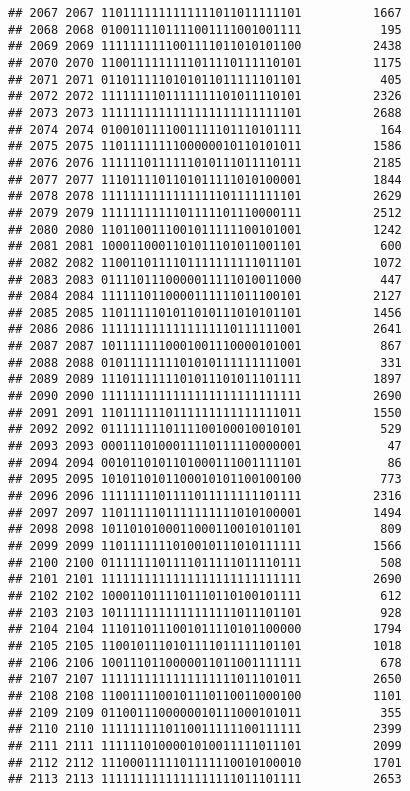 \documentclass[]{article}
\begin{document}
\begin{verbatim}
## 2067 2067 1101111111111111011011111101          1667
## 2068 2068 0100111101111001111001001111           195
## 2069 2069 1111111111001111011010101100          2438
## 2070 2070 1100111111111011110111110101          1175
## 2071 2071 0110111110101011011111101101           405
## 2072 2072 1111111101111111101011110101          2326
## 2073 2073 1111111111111111111111111101          2688
## 2074 2074 0100101111001111101110101111           164
## 2075 2075 1101111111100000010110101011          1586
## 2076 2076 1111110111111010111011110111          2185
## 2077 2077 1110111101101011111010100001          1844
## 2078 2078 1111111111111111101111111101          2629
## 2079 2079 1111111111101111101110000111          2512
## 2080 2080 1101100111001011111100101001          1242
## 2081 2081 1000110001101011101011001101           600
## 2082 2082 1100110111101111111111011101          1072
## 2083 2083 0111101110000011111010011000           447
## 2084 2084 1111110110000111111011100101          2127
## 2085 2085 1101111101011010111010101101          1456
## 2086 2086 1111111111111111110111111001          2641
## 2087 2087 1011111110001001110000101001           867
## 2088 2088 0101111111101010111111111001           331
## 2089 2089 1110111111101011101011101111          1897
## 2090 2090 1111111111111111111111111111          2690
## 2091 2091 1101111110111111111111111011          1550
## 2092 2092 0111111110111100100010010101           529
## 2093 2093 0001110100011110111110000001            47
## 2094 2094 0010110101101000111001111101            86
## 2095 2095 1010110101100010101100100100           773
## 2096 2096 1111111101111011111111101111          2316
## 2097 2097 1101111101111111111010100001          1494
## 2098 2098 1011010100011000110010101101           809
## 2099 2099 1101111111010010111010111111          1566
## 2100 2100 0111111101111011111011110111           508
## 2101 2101 1111111111111111111111111111          2690
## 2102 2102 1000110111101110110100101111           612
## 2103 2103 1011111111111111111011101101           928
## 2104 2104 1110110111001011110101100000          1794
## 2105 2105 1100101110101111011111101101          1018
## 2106 2106 1001110110000011011001111111           678
## 2107 2107 1111111111111111111011101011          2650
## 2108 2108 1100111100101110110011000100          1101
## 2109 2109 0110011100000010111000101011           355
## 2110 2110 1111111110110011111100111111          2399
## 2111 2111 1111110100001010011111011101          2099
## 2112 2112 1110001111101111110010100010          1701
## 2113 2113 1111111111111111111011101111          2653

\end{verbatim}
\end{document}
